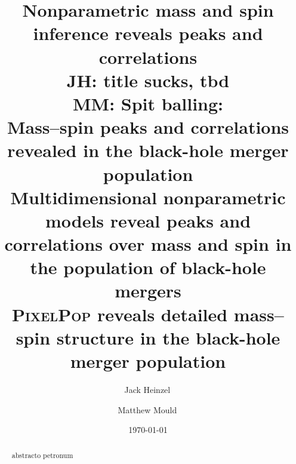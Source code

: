 \documentclass[%
    aps,
    prl,
    reprint,
    superscriptaddress,
    nolongbibliography,
    nobibnotes,
    nofootinbib,
    linenumbers,
    amsmath,amssymb,
]{revtex4-2}
\newcommand{\Msun}{\ensuremath{\mathrm{M}_{\odot}}}
\newcommand{\chieff}{\ensuremath{\chi_{\mathrm{eff}}}}
\newcommand{\red}[1]{{\color{Red} #1}}
\newcommand{\jh}[1]{{\color{orange}JH: #1}}
\newcommand{\mm}[1]{{\color{ForestGreen}MM: #1}}
\begin{document}
\title{
Nonparametric mass and spin inference reveals peaks and correlations
\\\jh{title sucks, tbd}
\\\mm{Spit balling:
\\Mass--spin peaks and correlations revealed in the black-hole merger population
\\Multidimensional nonparametric models reveal peaks and correlations over mass and spin in the population of black-hole mergers
\\\textsc{PixelPop} reveals detailed mass--spin structure in the black-hole merger population
}
}

\author{Jack Heinzel\,}
\affiliation{}

\author{Matthew Mould\,}


\date{\today}

\begin{abstract}
abstracto petronum

\end{abstract}

\maketitle
\end{document}
